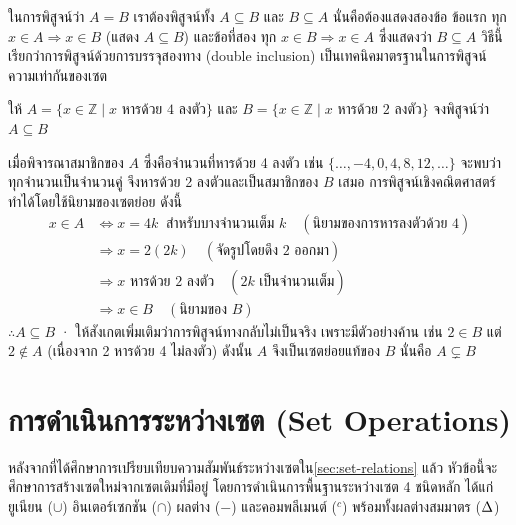 \begin{principle}
ในการพิสูจน์ว่า $A = B$ เราต้องพิสูจน์ทั้ง $A \subseteq B$ และ $B \subseteq A$ นั่นคือต้องแสดงสองข้อ ข้อแรก ทุก $x \in A \Rightarrow x \in B$ (แสดง $A \subseteq B$) และข้อที่สอง ทุก $x \in B \Rightarrow x \in A$ ซึ่งแสดงว่า $B \subseteq A$ วิธีนี้เรียกว่าการพิสูจน์ด้วยการบรรจุสองทาง (double inclusion) เป็นเทคนิคมาตรฐานในการพิสูจน์ความเท่ากันของเซต
\label{prin:double-inclusion}
\end{principle}

\begin{ex}
\label{ex:proof-subset-basic}
ให้ $A = \{x \in \mathbb{Z} \mid x \text{ หารด้วย } 4 \text{ ลงตัว}\}$ และ $B = \{x \in \mathbb{Z} \mid x \text{ หารด้วย } 2 \text{ ลงตัว}\}$ จงพิสูจน์ว่า $A \subseteq B$
\end{ex}
\begin{solution}
เมื่อพิจารณาสมาชิกของ $A$ ซึ่งคือจำนวนที่หารด้วย 4 ลงตัว เช่น $\{\ldots, -4, 0, 4, 8, 12, \ldots\}$ จะพบว่าทุกจำนวนเป็นจำนวนคู่ จึงหารด้วย 2 ลงตัวและเป็นสมาชิกของ $B$ เสมอ การพิสูจน์เชิงคณิตศาสตร์ทำได้โดยใช้นิยามของเซตย่อย ดังนี้
\begin{align*}
x \in A &\Leftrightarrow x = 4k \ \text{ สำหรับบางจำนวนเต็ม } k \quad (\text{นิยามของการหารลงตัวด้วย 4})\\
        &\Rightarrow x = 2(2k) \quad (\text{จัดรูปโดยดึง 2 ออกมา})\\
        &\Rightarrow x \text{ หารด้วย 2 ลงตัว} \quad (2k \text{ เป็นจำนวนเต็ม})\\
        &\Rightarrow x \in B \quad (\text{นิยามของ } B)
\end{align*}
$\therefore A \subseteq B$ · ให้สังเกตเพิ่มเติมว่าการพิสูจน์ทางกลับไม่เป็นจริง เพราะมีตัวอย่างค้าน เช่น $2 \in B$ แต่ $2 \notin A$ (เนื่องจาก 2 หารด้วย 4 ไม่ลงตัว) ดังนั้น $A$ จึงเป็นเซตย่อยแท้ของ $B$ นั่นคือ $A \subsetneq B$ \solhere
\end{solution}

\section{การดำเนินการระหว่างเซต (Set Operations)}
\label{sec:set-operations}

หลังจากที่ได้ศึกษาการเปรียบเทียบความสัมพันธ์ระหว่างเซตใน\autoref{sec:set-relations} แล้ว หัวข้อนี้จะศึกษาการสร้างเซตใหม่จากเซตเดิมที่มีอยู่ โดยการดำเนินการพื้นฐานระหว่างเซต 4 ชนิดหลัก ได้แก่ ยูเนียน ($\cup$) อินเตอร์เซกชัน ($\cap$) ผลต่าง ($-$) และคอมพลีเมนต์ ($^c$) พร้อมทั้งผลต่างสมมาตร ($\mathbin{\Delta}$)

